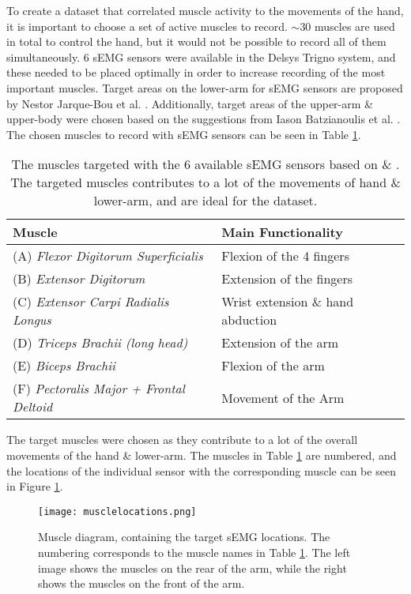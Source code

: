 \documentclass[../main.tex]{subfiles}
\begin{document}
To create a dataset that correlated muscle activity to the movements of the hand, it is important to choose a set of active muscles to record.
$\sim 30$ muscles are used in total to control the hand, but it would not be possible to record all of them simultaneously.
6 sEMG sensors were available in the Delsys Trigno \cite{trigno} system, and these needed to be placed optimally in order to increase recording of the most important muscles.
Target areas on the lower-arm for sEMG sensors are proposed by Nestor Jarque-Bou et al. \cite{jarque2019}.
Additionally, target areas of the upper-arm \& upper-body were chosen based on the suggestions from Iason Batzianoulis et al. \cite{Batzianoulis2018}.
The chosen muscles to record with sEMG sensors can be seen in Table \ref{tab:muscletargets}.

\begin{table}[H]
\begin{center}
\begin{tabular}{ |l|l| } 
\hline
Muscle & Main Functionality \\ 
\hline
(A) \textit{Flexor Digitorum Superficialis} & Flexion of the 4 fingers \\
(B) \textit{Extensor Digitorum} & Extension of the fingers \\
(C) \textit{Extensor Carpi Radialis Longus} & Wrist extension \& hand abduction \\
(D) \textit{Triceps Brachii (long head)} & Extension of the arm \\
(E) \textit{Biceps Brachii} & Flexion of the arm \\
(F) \textit{Pectoralis Major + Frontal Deltoid} & Movement of the Arm \\
\hline
\end{tabular}
\caption{The muscles targeted with the 6 available sEMG sensors based on \cite{Batzianoulis2018} \& \cite{jarque2019}.
 The targeted muscles contributes to a lot of the movements of hand \& lower-arm, and are ideal for the dataset.
}
\label{tab:muscletargets}
\end{center}
\end{table}

The target muscles were chosen as they contribute to a lot of the overall movements of the hand \& lower-arm.
The muscles in Table \ref{tab:muscletargets} are numbered, and the locations of the individual sensor with the corresponding muscle can be seen in Figure \ref{fig:musclesensordiagram}.

\begin{figure}[H]
\begin{center}
\texttt{[image: musclelocations.png]}
\caption{Muscle diagram, containing the target sEMG locations. The numbering corresponds to the muscle names in Table \ref{tab:muscletargets}. The left image shows the muscles on the rear of the arm, while the right shows the muscles on the front of the arm.}
\label{fig:musclesensordiagram}
\end{center}
\end{figure}
\end{document}
